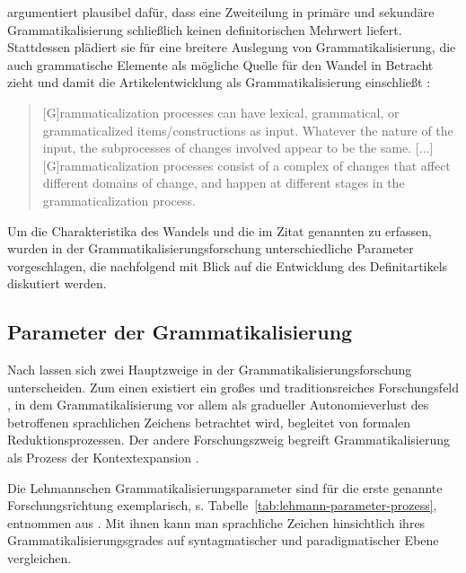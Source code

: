 \textcite{Breban2014} argumentiert plausibel dafür, dass eine Zweiteilung in primäre und sekundäre Grammatikalisierung schließlich keinen definitorischen Mehrwert liefert.
Stattdessen plädiert sie für eine breitere Auslegung von Grammatikalisierung, die auch grammatische Elemente als mögliche Quelle für den Wandel in Betracht zieht und damit die Artikelentwicklung als Grammatikalisierung einschließt  \parencite[zur weiterführenden Diskussion s.][]{Breban2012}: \blockcquote[498]{Breban2014}{[G]rammaticalization processes can have lexical, grammatical, or grammaticalized items/constructions as input. Whatever the nature of the input, the subprocesses of changes involved appear to be the same. [...] [G]ramma\-ticalization processes consist of a complex of changes that affect different domains of change, and happen at different stages in the grammaticalization process.}

\noindent 
Um die Charakteristika des Wandels und die im Zitat genannten  zu erfassen, wurden in der Grammatikalisierungsforschung unterschiedliche Parameter vorgeschlagen, die nachfolgend mit Blick auf die Entwicklung des Definitartikels diskutiert werden.   


\subsection{Parameter der Grammatikalisierung}\label{sec:parameter}

Nach \textcite[96--112]{Traugott2013} lassen sich zwei Hauptzweige in der Grammatikalisierungsforschung unterscheiden. Zum einen existiert ein großes und traditionsreiches Forschungsfeld \parencite[hierzu zählen u.a. die Arbeiten von][]{Givon1979,Haspelmath2004,Lehmann2015,}, in dem Grammatikalisierung vor allem als gradueller Autonomieverlust des betroffenen sprachlichen Zeichens betrachtet wird, begleitet von formalen Reduktionsprozessen. Der andere Forschungszweig begreift Grammatikalisierung als Prozess der Kontextexpansion \parencite{Himmelmann1997,Himmelmann2004}. 

Die Lehmannschen Grammatikalisierungsparameter sind für die erste genannte  Forschungsrichtung exemplarisch, s. Tabelle~\ref{tab:lehmann-parameter-prozess}, entnommen aus \textcite{Lehmann1995}. Mit ihnen kann man sprachliche Zeichen hinsichtlich ihres Grammatikalisierungsgrades auf syntagmatischer und paradigmatischer Ebene vergleichen. 

